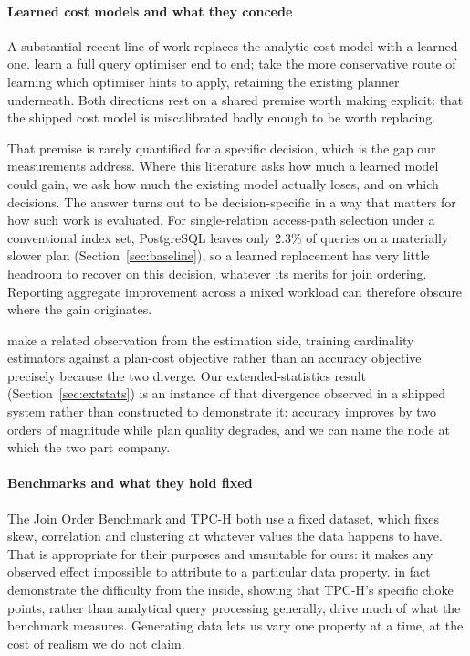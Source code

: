 \documentclass[preprint,12pt,authoryear]{elsarticle}
\begin{document}
\paragraph{Learned cost models and what they concede}
A substantial recent line of work replaces the analytic cost model with
a learned one. \citet{marcus2019neo} learn a full query optimiser end to
end; \citet{marcus2021bao} take the more conservative route of learning
which optimiser hints to apply, retaining the existing planner
underneath. Both directions rest on a shared premise worth making
explicit: that the shipped cost model is miscalibrated badly enough to
be worth replacing.

That premise is rarely quantified for a specific decision, which is the
gap our measurements address. Where this literature asks how much a
learned model could gain, we ask how much the existing model actually
loses, and on which decisions. The answer turns out to be
decision-specific in a way that matters for how such work is evaluated.
For single-relation access-path selection under a conventional index
set, PostgreSQL leaves only 2.3\% of queries on a materially slower
plan (Section~\ref{sec:baseline}), so a learned replacement has very
little headroom to recover on this decision, whatever its merits for
join ordering. Reporting aggregate improvement across a mixed workload
can therefore obscure where the gain originates.

\citet{negi2021flow} make a related observation from the estimation
side, training cardinality estimators against a plan-cost objective
rather than an accuracy objective precisely because the two diverge.
Our extended-statistics result (Section~\ref{sec:extstats}) is an
instance of that divergence observed in a shipped system rather than
constructed to demonstrate it: accuracy improves by two orders of
magnitude while plan quality degrades, and we can name the node at
which the two part company.

\paragraph{Benchmarks and what they hold fixed}
The Join Order Benchmark \citep{leis2015good} and TPC-H
\citep{boncz2013tpch} both use a fixed dataset, which fixes skew,
correlation and clustering at whatever values the data happens to have.
That is appropriate for their purposes and unsuitable for ours: it
makes any observed effect impossible to attribute to a particular data
property. \citet{boncz2013tpch} in fact demonstrate the difficulty from
the inside, showing that TPC-H's specific choke points, rather than
analytical query processing generally, drive much of what the benchmark
measures. Generating data lets us vary one property at a time, at the
cost of realism we do not claim.
\end{document}
